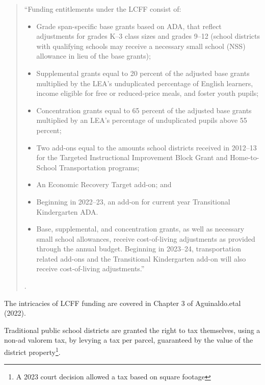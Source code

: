 \begin{description}[nosep]
\begin{quotation}
  \noindent{}``Funding entitlements under the LCFF consist of:\\
  \begin{itemize}
    \item Grade span-specific base grants based on ADA, that reflect adjustments for grades K–3 class sizes and grades 9–12 (school districts with qualifying schools may receive a necessary small school (NSS) allowance in lieu of the base grants);
    \item Supplemental grants equal to 20 percent of the adjusted base grants multiplied by the LEA’s unduplicated percentage of English learners, income eligible for free or reduced-price meals, and foster youth pupils;
    \item Concentration grants equal to 65 percent of the adjusted base grants multiplied by an LEA’s percentage of unduplicated pupils above 55 percent;
    \item Two add-ons equal to the amounts school districts received in 2012–13 for the Targeted Instructional Improvement Block Grant and Home-to-School Transportation programs;
    \item An Economic Recovery Target add-on; and
    \item Beginning in 2022–23, an add-on for current year Transitional Kindergarten ADA.
    \item Base, supplemental, and concentration grants, as well as necessary small school allowances, receive cost-of-living adjustments as provided through the annual budget. Beginning in 2023–24, transportation related add-ons and the Transitional Kindergarten add-on will also receive cost-of-living adjustments.''
  \end{itemize}
  .
\end{quotation}

The intricacies of LCFF funding are covered in Chapter 3 of Aguinaldo.etal (2022). %
  \medskip\item[Local property tax] Traditional public school districts are granted the right to tax themselves, using a non-ad valorem tax, by levying a tax per parcel, guaranteed by the value of the district property\footnote{A 2023 court decision allowed a tax based on square footage}.\\
\end{description}

